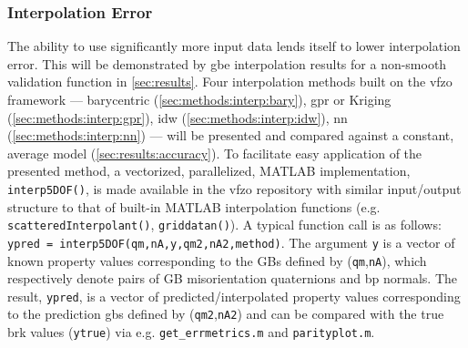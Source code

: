 \documentclass[final,twocolumn,12pt]{elsarticle}
\newcommand{\outpt}{prediction}
\newcommand{\vfzorepo}{\gls{vfzo} repository}
\begin{document}

\subsubsection{Interpolation Error} \label{sec:intro:interp-error}
The ability to use significantly more input data lends itself to lower interpolation error. This will be demonstrated by \gls{gbe} interpolation results for a non-smooth validation function in \cref{sec:results}.
Four interpolation methods built on the \gls{vfzo} framework --- barycentric (\cref{sec:methods:interp:bary}), \gls{gpr} or Kriging (\cref{sec:methods:interp:gpr}), \gls{idw} (\cref{sec:methods:interp:idw}), \gls{nn} (\cref{sec:methods:interp:nn}) --- will be presented and compared against a constant, average model (\cref{sec:results:accuracy}). To facilitate easy application of the presented method, a vectorized, parallelized, MATLAB implementation, \texttt{interp5DOF()}, is made available in the \vfzorepo{} \cite{bairdFiveDegreeofFreedom5DOF2020} with similar input/output structure to that of built-in MATLAB interpolation functions (e.g. \texttt{scatteredInterpolant()}, \texttt{griddatan()}). A typical function call is as follows: \texttt{ypred = interp5DOF(qm,nA,y,qm2,nA2,method)}. The argument \texttt{y} is a vector of known property values corresponding to the GBs defined by (\texttt{qm},\texttt{nA}), which respectively denote pairs of GB misorientation quaternions and \gls{bp} normals. The result, \texttt{ypred}, is a vector of predicted/interpolated property values corresponding to the \outpt{} \glspl{gb} defined by (\texttt{qm2},\texttt{nA2}) and can be compared with the true \gls{brk} values (\texttt{ytrue}) via e.g. \texttt{get\_errmetrics.m} and \texttt{parityplot.m}.
\end{document}
